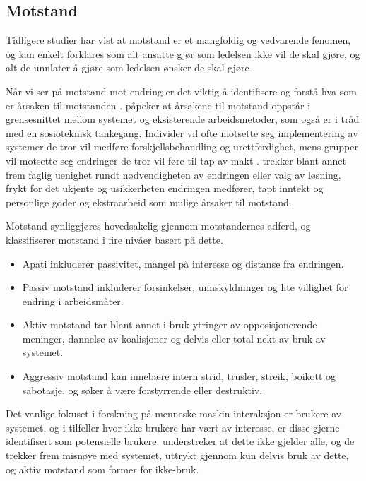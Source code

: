 \subsection{Motstand}
\label{sec:motstand}
Tidligere studier har vist at motstand er et mangfoldig og vedvarende fenomen, og kan enkelt forklares som alt ansatte gjør som ledelsen ikke vil de skal gjøre, og alt de unnlater å gjøre som ledelsen ønsker de skal gjøre \citep{Timmons03}.
 
\noindent
Når vi ser på motstand mot endring er det viktig å identifisere og forstå hva som er årsaken til motstanden \citep{Lapointe05}. \citet{Timmons03} påpeker at årsakene til motstand oppstår i grensesnittet mellom systemet og eksisterende arbeidsmetoder, som også er i tråd med en sosioteknisk tankegang. Individer vil ofte motsette seg implementering av systemer de tror vil medføre forskjellsbehandling og urettferdighet, mens grupper vil motsette seg endringer de tror vil føre til tap av makt \citep{Lapointe05}. \citet{Jacobsen12} trekker blant annet frem faglig uenighet rundt nødvendigheten av endringen eller valg av løsning, frykt for det ukjente og usikkerheten endringen medfører, tapt inntekt og personlige goder og ekstraarbeid som mulige årsaker til motstand.
 
\noindent
Motstand synliggjøres hovedsakelig gjennom motstandernes adferd, og \citet{Lapointe05} klassifiserer motstand i fire nivåer basert på dette.
 
\begin{itemize}
\item Apati inkluderer passivitet, mangel på interesse og distanse fra endringen.
\item Passiv motstand inkluderer forsinkelser, unnskyldninger og lite villighet for endring i arbeidsmåter.
\item Aktiv motstand tar blant annet i bruk ytringer av opposisjonerende meninger, dannelse av koalisjoner og delvis eller total nekt av bruk av systemet.
\item Aggressiv motstand kan innebære intern strid, trusler, streik, boikott og sabotasje, og søker å være forstyrrende eller destruktiv.
\end{itemize}
 
\noindent
Det vanlige fokuset i forskning på menneske-maskin interaksjon er brukere av systemet, og i tilfeller hvor ikke-brukere har vært av interesse, er disse gjerne identifisert som potensielle brukere. \citet{Satchell09} understreker at dette ikke gjelder alle, og de trekker frem misnøye med systemet, uttrykt gjennom kun delvis bruk av dette, og aktiv motstand som former for ikke-bruk.
 
